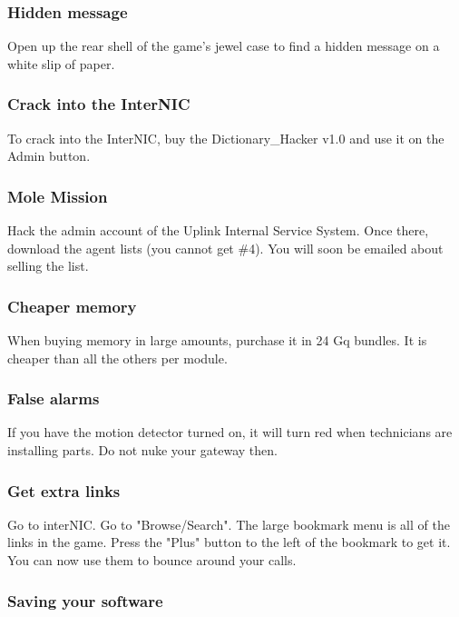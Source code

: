 \documentclass[11pt,twoside,a4paper]{book}
\begin{document}
\subsubsection{Hidden message}

Open up the rear shell of the game's jewel case to find a hidden message on a white slip of paper. 

\subsubsection{Crack into the InterNIC}

To crack into the InterNIC, buy the Dictionary\_Hacker v1.0 and use it on the Admin button.

\subsubsection{Mole Mission}

Hack the admin account of the Uplink Internal Service System. Once there, download the agent lists (you cannot get \#4). You will soon be emailed about selling the list. 

\subsubsection{Cheaper memory}

When buying memory in large amounts, purchase it in 24 Gq bundles. It is cheaper than all the others per module.

\subsubsection{False alarms}

If you have the motion detector turned on, it will turn red when technicians are installing parts. Do not nuke your gateway then.

\subsubsection{Get extra links}

Go to interNIC. Go to "Browse/Search". The large bookmark menu is all of the links in the game. Press the "Plus" button to the left of the bookmark to get it. You can now use them to bounce around your calls. 

\subsubsection{Saving your software}
\end{document}
